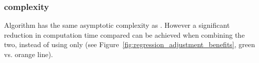 \subsubsection{\algoReg complexity}\label{subsubsec:regression-complexity}
Algorithm \algoReg has the same asymptotic complexity as \algoMultBinary.
%
However a significant reduction in computation time compared can be achieved when combining the two, instead of using \algoMultBinary only (see Figure~\ref{fig:regression_adjustment_benefits}, green vs. orange line).
\FloatBarrier
